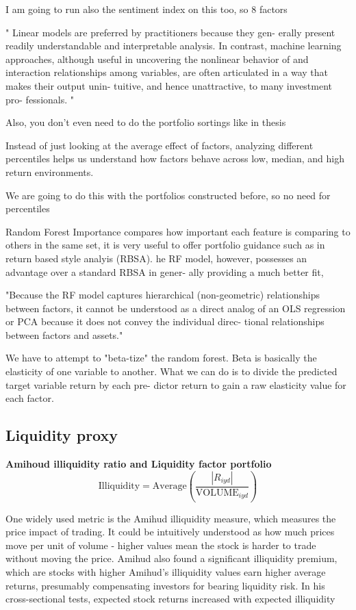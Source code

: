 I am going to run also the sentiment index on this too, so 8 factors

" Linear
models are preferred by practitioners because they gen-
erally present readily understandable and interpretable
analysis. In contrast, machine learning approaches,
although useful in uncovering the nonlinear behavior
of and interaction relationships among variables, are
often articulated in a way that makes their output unin-
tuitive, and hence unattractive, to many investment pro-
fessionals. "

Also, you don't even need to do the portfolio sortings like in thesis

Instead of just looking at the average effect of factors, analyzing different percentiles helps us understand how factors behave across low, median, and high return environments.

We are going to do this with the portfolios constructed before, so no need for percentiles


Random Forest Importance compares how important each feature is comparing to others in the same set, it is very useful to offer portfolio guidance such as in  return based style analyis (RBSA). he RF model, however,
possesses an advantage over a standard RBSA in gener-
ally providing a much better fit,

"Because the RF model captures hierarchical
(non-geometric) relationships between factors, it cannot
be understood as a direct analog of an OLS regression
or PCA because it does not convey the individual direc-
tional relationships between factors and assets."

We have to attempt to "beta-tize" the random forest. Beta is basically the elasticity of one variable to another. What we can do is to divide the predicted target variable return by each pre-
dictor return to gain a raw elasticity value for each factor.

\subsection{Liquidity proxy}

\textbf{Amihoud illiquidity ratio and Liquidity factor portfolio}
$$\text{Illiquidity} = \text{Average} \left( \frac{|R_{iyd}|}{\text{VOLUME}_{iyd}} \right)
$$

One widely used metric is the Amihud illiquidity measure, which measures the price impact of trading. It could be intuitively understood as how much prices move per unit of volume - higher values mean the stock is harder to trade without moving the price. Amihud also found a significant illiquidity premium, which are stocks with higher Amihud's illiquidity values earn higher average returns, presumably compensating investors for bearing liquidity risk. In his cross-sectional tests, expected stock returns increased with expected illiquidity \cite{amihud_2002}


